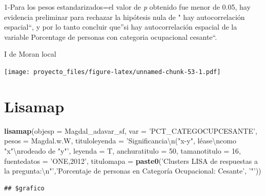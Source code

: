 \documentclass[11pt,]{article}
\newenvironment{Shaded}{\begin{snugshade}}{\end{snugshade}}
\newcommand{\KeywordTok}[1]{\textcolor[rgb]{0.13,0.29,0.53}{\textbf{#1}}}
\newcommand{\DataTypeTok}[1]{\textcolor[rgb]{0.13,0.29,0.53}{#1}}
\newcommand{\DecValTok}[1]{\textcolor[rgb]{0.00,0.00,0.81}{#1}}
\newcommand{\CharTok}[1]{\textcolor[rgb]{0.31,0.60,0.02}{#1}}
\newcommand{\StringTok}[1]{\textcolor[rgb]{0.31,0.60,0.02}{#1}}
\newcommand{\OperatorTok}[1]{\textcolor[rgb]{0.81,0.36,0.00}{\textbf{#1}}}
\newcommand{\NormalTok}[1]{#1}
\begin{document}
1-Para los pesos estandarizados=el valor de \emph{p} obtenido fue menor
de 0.05, hay evidencia preliminar para rechazar la hipótesis nula de "
hay autocorrelación espacial``, y por lo tanto concluir que''si hay
autocorrelación espacial de la variable Porcentage de personas con
categoria ocupacional cesante``.

I de Moran local

\begin{Shaded}
\end{Shaded}

\texttt{[image: proyecto\_files/figure-latex/unnamed-chunk-53-1.pdf]}

\section{Lisamap}\label{lisamap}

\begin{Shaded}
\begin{Highlighting}[]
\KeywordTok{lisamap}\NormalTok{(}\DataTypeTok{objesp =}\NormalTok{ Magdal_adavar_sf,}
        \DataTypeTok{var =} \StringTok{'PCT_CATEGOCUPCESANTE'}\NormalTok{,}
        \DataTypeTok{pesos =}\NormalTok{ Magdal.w.W,}
        \DataTypeTok{tituloleyenda =} \StringTok{'Significancia}\CharTok{\textbackslash{}n}\StringTok{("x-y", léase}\CharTok{\textbackslash{}n}\StringTok{como "x"}\CharTok{\textbackslash{}n}\StringTok{rodeado de "y"'}\NormalTok{,}
        \DataTypeTok{leyenda =}\NormalTok{ T,}
        \DataTypeTok{anchuratitulo =} \DecValTok{50}\NormalTok{,}
        \DataTypeTok{tamanotitulo =} \DecValTok{16}\NormalTok{,}
        \DataTypeTok{fuentedatos =} \StringTok{'ONE,2012'}\NormalTok{,}
        \DataTypeTok{titulomapa =} \KeywordTok{paste0}\NormalTok{(}\StringTok{'Clusters LISA de respuestas a la pregunta:}\CharTok{\textbackslash{}n}\StringTok{"'}\NormalTok{,}\StringTok{'Porcentaje de personas en Categoría Ocupacional: Cesante'}\NormalTok{, }\StringTok{'"'}\NormalTok{))}
\end{Highlighting}
\end{Shaded}

\begin{verbatim}
## $grafico
\end{verbatim}
\end{document}
